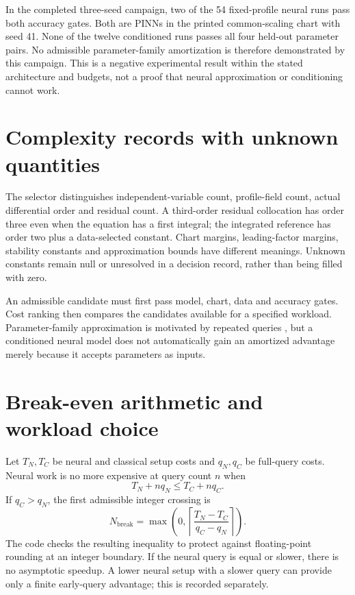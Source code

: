 \documentclass[12pt,a4paper,oneside]{report}
\numberwithin{equation}{chapter}
\begin{document}
In the completed three-seed campaign, two of the 54 fixed-profile neural
runs pass both accuracy gates. Both are PINNs in the printed common-scaling
chart with seed 41. None of the twelve conditioned runs passes all four
held-out parameter pairs. No admissible parameter-family amortization is
therefore demonstrated by this campaign. This is a negative experimental
result within the stated architecture and budgets, not a proof that neural
approximation or conditioning cannot work.

\section{Complexity records with unknown quantities}
The selector distinguishes independent-variable count, profile-field count,
actual differential order and residual count. A third-order residual
collocation has order three even when the equation has a first integral; the
integrated reference has order two plus a data-selected constant. Chart
margins, leading-factor margins, stability constants and approximation bounds
have different meanings. Unknown constants remain null or unresolved in a
decision record, rather than being filled with zero.

An admissible candidate must first pass model, chart, data and accuracy
gates. Cost ranking then compares the candidates available for a specified
workload. Parameter-family approximation is motivated by repeated queries
\cite{cohen2015}, but a conditioned neural model does not automatically gain
an amortized advantage merely because it accepts parameters as inputs.

\section{Break-even arithmetic and workload choice}
Let $T_N,T_C$ be neural and classical setup costs and $q_N,q_C$ be full-query
costs. Neural work is no more expensive at query count $n$ when
\begin{equation}\label{eq:cost}
T_N+nq_N\leq T_C+nq_C.
\end{equation}
If $q_C>q_N$, the first admissible integer crossing is
\begin{equation}\label{eq:break}
N_{\mathrm{break}}=\max\left(0,
\left\lceil\frac{T_N-T_C}{q_C-q_N}\right\rceil\right).
\end{equation}
The code checks the resulting inequality to protect against floating-point
rounding at an integer boundary. If the neural query is equal or slower,
there is no asymptotic speedup. A lower neural setup with a slower query can
provide only a finite early-query advantage; this is recorded separately.
\end{document}
